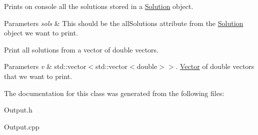 Prints on console all the solutions stored in a \hyperlink{class_solution}{Solution} object. 
\begin{DoxyParams}{Parameters}
{\em sols} & This should be the all\+Solutions attribute from the \hyperlink{class_solution}{Solution} object we want to print.\\
\hline
\end{DoxyParams}
Print all solutions from a vector of double vectors. 
\begin{DoxyParams}{Parameters}
{\em v} & std\+::vector$<$std\+::vector$<$double$>$$>$. \hyperlink{class_vector}{Vector} of double vectors that we want to print. \\
\hline
\end{DoxyParams}


The documentation for this class was generated from the following files\+:\begin{DoxyCompactItemize}
\item 
Output.\+h\item 
Output.\+cpp\end{DoxyCompactItemize}
